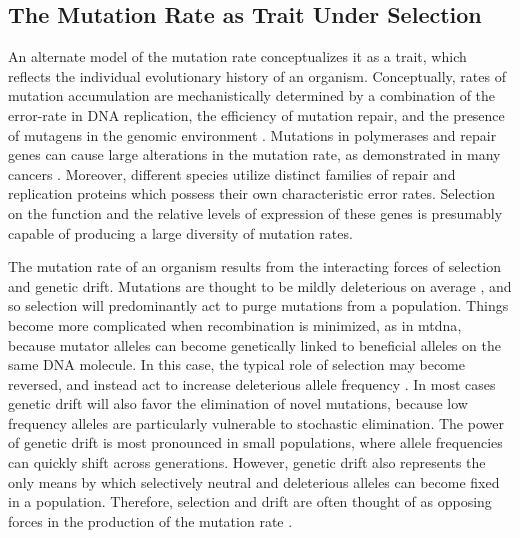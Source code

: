 \documentclass[12pt,twoside]{reedthesis}
\begin{document}
\subsection{The Mutation Rate as Trait Under Selection}

An alternate model of the mutation rate conceptualizes it as a trait, which reflects the individual evolutionary history of an organism. 
Conceptually, rates of mutation accumulation are mechanistically determined by a combination of the error-rate in DNA replication, the efficiency of mutation repair, and the presence of mutagens in the genomic environment \citep{baer_mutation_2007}.
Mutations in polymerases and repair genes can cause large alterations in the mutation rate, as demonstrated in many cancers \citep{umar_dna-replication_1996}.
Moreover, different species utilize distinct families of repair \citep{eisen_phylogenomic_1999} and replication proteins \citep{filee_evolution_2002} which possess their own characteristic error rates.
Selection on the function and the relative levels of expression of these genes is presumably capable of producing a large diversity of mutation rates. 

The mutation rate of an organism results from the interacting forces of selection and genetic drift.
Mutations are thought to be mildly deleterious on average \citep{keightley_toward_2003}, and so selection will predominantly act to purge mutations from a population.
Things become more complicated when recombination is minimized, as in \gls{mtdna}, because mutator alleles can become genetically linked to beneficial alleles on the same DNA molecule.
In this case, the typical role of selection may become reversed, and instead act to increase deleterious allele frequency \citep{sniegowski_evolution_2000}.
In most cases genetic drift will also favor the elimination of novel mutations, because low frequency alleles are particularly vulnerable to stochastic elimination.
The power of genetic drift is most pronounced in small populations, where allele frequencies can quickly shift across generations.
However, genetic drift also represents the only means by which selectively neutral and deleterious alleles can become fixed in a population.
Therefore, selection and drift are often thought of as opposing forces in the production of the mutation rate \citep{sniegowski_evolution_2000, lynch_lower_2011}.
\end{document}
